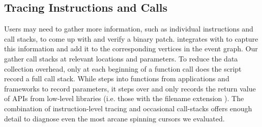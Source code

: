 \subsection{Tracing Instructions and Calls}

Users may need to gather more information, such as individual instructions and
call stacks, to come up with and verify a binary patch. \xxx integrates with
 to capture this information and add it to the corresponding
vertices in the event graph. Our  gather call stacks at
relevant locations and parameters. To reduce the data
collection overhead, only at each beginning of a function call does the script
record a full call stack. While  steps into functions from applications and
frameworks to record parameters, it steps over and only records the
return value of APIs from low-level libraries (i.e. those with the filename
extension ). The combination of instruction-level tracing and
occasional call-stacks offers enough detail to diagnose even the most
arcane spinning cursors we evaluated.

